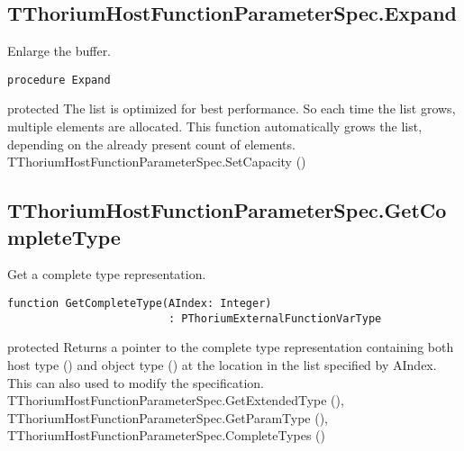 \subsection{TThoriumHostFunctionParameterSpec.Expand}
\label{thoriumcorepkg:thorium:tthoriumhostfunctionparameterspec:expand}
\begin{FPCList}
\Synopsis
Enlarge the buffer.\Declaration 

\begin{verbatim}
procedure Expand
\end{verbatim}
\Visibility
protected
\Description
The list is optimized for best performance. So each time the list grows, multiple elements are allocated. This function automatically grows the list, depending on the already present count of elements.\SeeAlso
TThoriumHostFunctionParameterSpec.SetCapacity (\pageref{thoriumcorepkg:thorium:tthoriumhostfunctionparameterspec:setcapacity})\end{FPCList}
\subsection{TThoriumHostFunctionParameterSpec.GetCompleteType}
\label{thoriumcorepkg:thorium:tthoriumhostfunctionparameterspec:getcompletetype}
\begin{FPCList}
\Synopsis
Get a complete type representation.\Declaration 

\begin{verbatim}
function GetCompleteType(AIndex: Integer)
                         : PThoriumExternalFunctionVarType
\end{verbatim}
\Visibility
protected
\Description
Returns a pointer to the complete type representation containing both host type (\pageref{thoriumcorepkg:thorium}) and object type (\pageref{thoriumcorepkg:thorium:tthoriumhostobjecttype}) at the location in the list specified by AIndex. This can also used to modify the specification.\SeeAlso
TThoriumHostFunctionParameterSpec.GetExtendedType (\pageref{thoriumcorepkg:thorium:tthoriumhostfunctionparameterspec:getextendedtype}),
TThoriumHostFunctionParameterSpec.GetParamType (\pageref{thoriumcorepkg:thorium:tthoriumhostfunctionparameterspec:getparamtype}),
TThoriumHostFunctionParameterSpec.CompleteTypes (\pageref{thoriumcorepkg:thorium:tthoriumhostfunctionparameterspec:completetypes})\end{FPCList}
